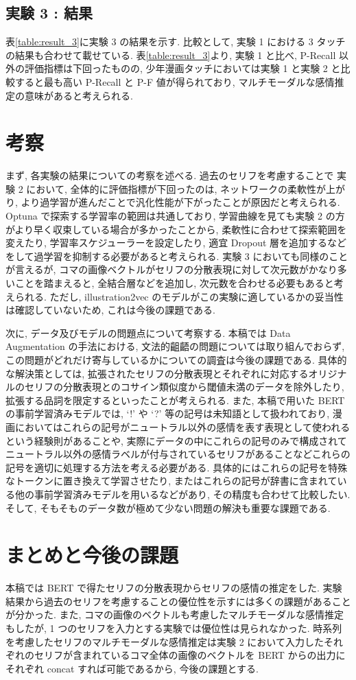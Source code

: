 \documentclass[twocolumn]{jarticle}     %
\begin{document}
\subsection{実験 3 : 結果}
表\ref{table:result_3}に実験 3 の結果を示す. 比較として, 実験 1 における 3 タッチの結果も合わせて載せている.
表\ref{table:result_3}より, 実験 1 と比べ, P-Recall 以外の評価指標は下回ったものの, 少年漫画タッチにおいては実験 1 と実験 2 と比較すると最も高い P-Recall と P-F 値が得られており, マルチモーダルな感情推定の意味があると考えられる.


\section{考察}
まず, 各実験の結果についての考察を述べる. 過去のセリフを考慮することで 実験 2 において, 全体的に評価指標が下回ったのは, ネットワークの柔軟性が上がり, より過学習が進んだことで汎化性能が下がったことが原因だと考えられる. Optuna で探索する学習率の範囲は共通しており, 学習曲線を見ても実験 2 の方がより早く収束している場合が多かったことから, 柔軟性に合わせて探索範囲を変えたり, 学習率スケジューラーを設定したり, 適宜 Dropout 層を追加するなどをして過学習を抑制する必要があると考えられる. 実験 3 においても同様のことが言えるが, コマの画像ベクトルがセリフの分散表現に対して次元数がかなり多いことを踏まえると, 全結合層などを追加し, 次元数を合わせる必要もあると考えられる. ただし, illustration2vec のモデルがこの実験に適しているかの妥当性は確認していないため, これは今後の課題である.

次に, データ及びモデルの問題点について考察する. 本稿では Data Augmentation の手法における, 文法的齟齬の問題については取り組んでおらず, この問題がどれだけ寄与しているかについての調査は今後の課題である. 具体的な解決策としては, 拡張されたセリフの分散表現とそれぞれに対応するオリジナルのセリフの分散表現とのコサイン類似度から閾値未満のデータを除外したり, 拡張する品詞を限定するといったことが考えられる. また, 本稿で用いた BERT の事前学習済みモデルでは, `!' や `?' 等の記号は未知語として扱われており, 漫画においてはこれらの記号がニュートラル以外の感情を表す表現として使われるという経験則があることや, 実際にデータの中にこれらの記号のみで構成されてニュートラル以外の感情ラベルが付与されているセリフがあることなどこれらの記号を適切に処理する方法を考える必要がある. 具体的にはこれらの記号を特殊なトークンに置き換えて学習させたり, またはこれらの記号が辞書に含まれている他の事前学習済みモデルを用いるなどがあり, その精度も合わせて比較したい. そして, そもそものデータ数が極めて少ない問題の解決も重要な課題である.

\section{まとめと今後の課題}
本稿では BERT で得たセリフの分散表現からセリフの感情の推定をした. 実験結果から過去のセリフを考慮することの優位性を示すには多くの課題があることが分かった. また, コマの画像のベクトルも考慮したマルチモーダルな感情推定もしたが, 1 つのセリフを入力とする実験では優位性は見られなかった. 時系列を考慮したセリフのマルチモーダルな感情推定は実験 2 において入力したそれぞれのセリフが含まれているコマ全体の画像のベクトルを BERT からの出力にそれぞれ concat すれば可能であるから, 今後の課題とする.
\end{document}
